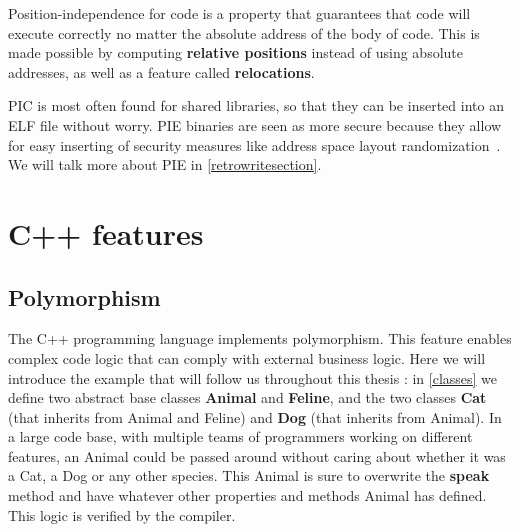 \documentclass[a4paper,11pt,oneside]{report}
\begin{document}
Position-independence for code is a property that guarantees that code will 
execute correctly no matter the absolute address of the body of code.
This is made possible by computing \textbf{relative positions} instead of
using absolute addresses, as well as a feature called \textbf{relocations}.

PIC is most often found for shared libraries, so that they can be inserted into 
an ELF file without worry.
PIE binaries are seen as more secure because they allow for easy inserting of 
security measures like address space layout 
randomization~\cite{aslr}.
We will talk more about PIE in \autoref{retrowritesection}.

\section{C++ features}

\subsection{Polymorphism}
\label{polymorphism}

The C++ programming language implements polymorphism.
This feature enables complex code logic that can comply with external business 
logic.
Here we will introduce the example that will follow us throughout this thesis :
in \autoref{classes} we define two abstract base classes \textbf{Animal} and 
\textbf{Feline},
and the two classes \textbf{Cat} (that inherits from Animal and Feline) and 
\textbf{Dog} (that inherits from Animal).
In a large code base, with multiple teams of programmers working on different 
features,
an Animal could be passed around without caring about whether it was a Cat, a 
Dog or any other species.
This Animal is sure to overwrite the \textbf{speak} method and have whatever 
other properties and methods Animal has defined.
This logic is verified by the compiler.
\end{document}
